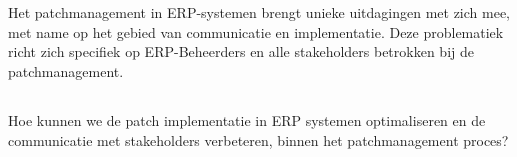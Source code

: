 
\chapter{}%
\label{ch:inleiding}




\section{}%
\label{sec:probleemstelling}

Het patchmanagement in ERP-systemen brengt unieke uitdagingen met zich mee, met name op het gebied van communicatie en implementatie. Deze problematiek richt zich specifiek op ERP-Beheerders en alle stakeholders betrokken bij de patchmanagement.

\section{}%
\label{sec:onderzoeksvraag}

Hoe kunnen we de patch implementatie in ERP systemen optimaliseren en de communicatie met stakeholders verbeteren, binnen het patchmanagement proces?

